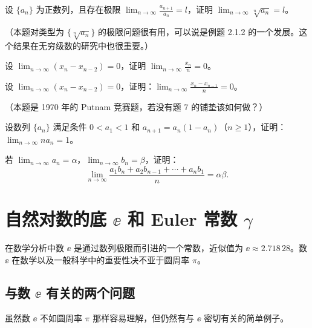 \begin{xexercise}[6]
设 $\{a_n\}$ 为正数列，且存在极限 $\displaystyle\lim_{n\to\infty}\frac{a_{n+1}}{a_n}=l$，证明 $\displaystyle\lim_{n\to\infty}\sqrt[n]{a_n}=l$。

  （本题对类型为 $\{\sqrt[n]{a_n}\}$ 的极限问题很有用，可以说是例题 2.1.2 的一个发展。这个结果在无穷级数的研究中也很重要。）
\end{xexercise}

\begin{xexercise}[7]
设 $\displaystyle\lim_{n\to\infty}(x_n-x_{n-2})=0$，证明 $\displaystyle\lim_{n\to\infty}\frac{x_n}{n}=0$。
\end{xexercise}

\begin{xexercise}[8]
设 $\displaystyle\lim_{n\to\infty}(x_n-x_{n-2})=0$，证明：$\displaystyle\lim_{n\to\infty}\frac{x_n-x_{n-1}}n=0$。

  （本题是 1970 年的 Putnam 竞赛题，若没有题 7 的铺垫该如何做？）
\end{xexercise}

\begin{xexercise}[9]
设数列 $\{a_n\}$ 满足条件 $0<a_1<1$ 和 $a_{n+1}=a_n(1-a_n)$（$n\ge1$），证明：$\displaystyle\lim_{n\to\infty}na_n=1$。
\end{xexercise}

\begin{xexercise}[10]
若 $\displaystyle\lim_{n\to\infty}a_n=\alpha$，$\displaystyle\lim_{n\to\infty}b_n=\beta$，证明：
  \[
    \lim_{n\to\infty}\frac{a_1b_n+a_2b_{n-1}+\cdots+a_nb_1}{n}=\alpha\beta.
  \]
\end{xexercise}

\section{\texorpdfstring{自然对数的底 $\ee$ 和 Euler 常数 $\gamma$}{自然对数的底 e 和 Euler 常数 gamma}}

在数学分析中数 $\ee$ 是通过数列极限而引进的一个常数，近似值为 $\ee\approx2.718\,28$。数 $\ee$ 在数学以及一般科学中的重要性决不亚于圆周率 $\pi$。

\subsection{\texorpdfstring{与数 $\ee$ 有关的两个问题}{与数 e 有关的两个问题}}

虽然数 $\ee$ 不如圆周率 $\pi$ 那样容易理解，但仍然有与 $\ee$ 密切有关的简单例子。

